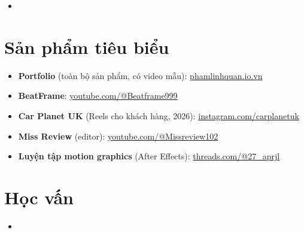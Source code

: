 \documentclass[11pt,a4paper,sans]{moderncv}
\begin{document}
\begin{itemize}
\vspace{3pt}

\item{}

\end{itemize}


\section{Sản phẩm tiêu biểu}
\vspace{1pt}
\begin{itemize}
\item {\textbf{Portfolio} (toàn bộ sản phẩm, có video mẫu): \href{https://www.phamlinhquan.io.vn/}{phamlinhquan.io.vn}}
\item {\textbf{BeatFrame}: \href{https://www.youtube.com/@Beatframe999}{youtube.com/@Beatframe999}}
\item {\textbf{Car Planet UK} (Reels cho khách hàng, 2026): \href{https://www.instagram.com/carplanetuk/}{instagram.com/carplanetuk}}
\item {\textbf{Miss Review} (editor): \href{https://www.youtube.com/@Missreview102}{youtube.com/@Missreview102}}
\item {\textbf{Luyện tập motion graphics} (After Effects): \href{https://www.threads.com/@27_aprjl}{threads.com/@27\_aprjl}}
\end{itemize}


\section{Học vấn}
\vspace{1pt}
\begin{itemize}
\item{}
\end{itemize}
\end{document}
